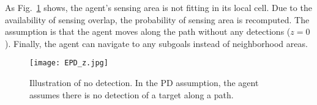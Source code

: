 As Fig.~\ref{fig:EPD_z} shows, the agent's sensing area is not fitting in its local cell.
Due to the availability of sensing overlap, the probability of sensing area is recomputed.
The assumption is that the agent moves along the path without any detections ($z=0$).
Finally, the agent can navigate to any subgoals instead of neighborhood areas.



\begin{figure}[htbp]
 \begin{center}
  \centering
  \texttt{[image: EPD\_z.jpg]}
\caption{Illustration of no detection. In the PD assumption, the agent assumes there is no detection of a target along a path.}
\label{fig:EPD_z}
 \end{center}
 \end{figure} 